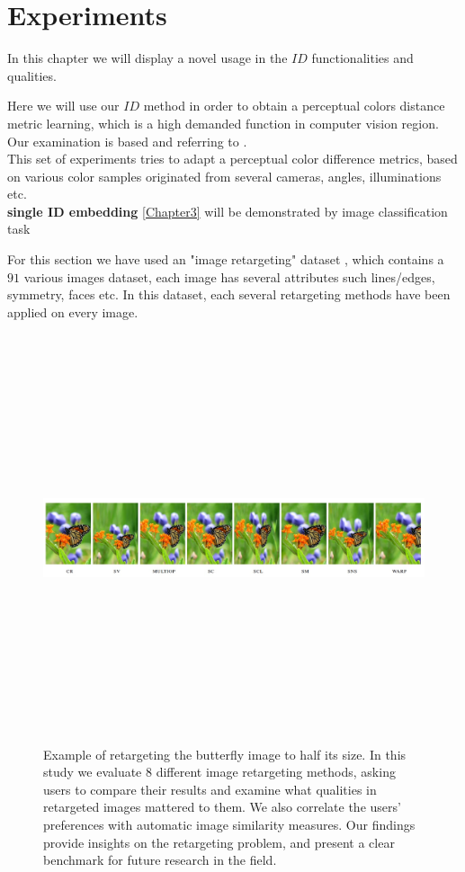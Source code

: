 
\chapter{Experiments} %

\label{Chapter8}

In this chapter we will display a novel usage in the $ID$ functionalities and qualities.

Here we will use our $ID$ method in order to obtain a perceptual colors distance metric learning, which is a high demanded function in computer vision region. Our examination is based and referring to \cite{perp_color}. 
\\This set of experiments tries to adapt a perceptual color difference metrics, based on various color samples originated from several cameras, angles, illuminations etc.\\

\textbf{single ID embedding} \ref{Chapter3} will be demonstrated by image classification task


For this section we have used an "image retargeting" dataset \cite{ggg}, which contains a $91$ various images dataset, each image has several attributes such lines/edges, symmetry, faces etc. In this dataset, each several retargeting methods have been applied on every image.

\begin{figure}[h] \label{rteregt}
	
	\includegraphics[width=\linewidth,height=12cm,keepaspectratio]{Figures/retargeting}
	\caption[image retargeting example]
	{Example of retargeting the butterfly image to half its size. In this study we evaluate 8 different image retargeting methods, asking users to compare their results and examine what qualities in retargeted images mattered to them. We also correlate the users’ preferences with automatic image similarity measures. Our findings provide insights on the retargeting problem, and present a clear benchmark for future research in the field.}
	
\end{figure}


